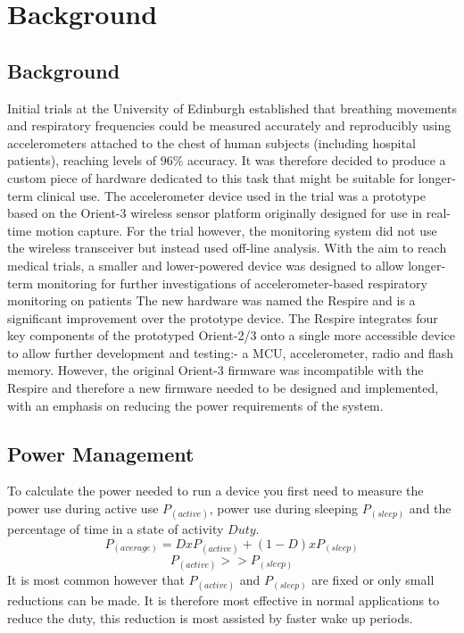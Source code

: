 \chapter{Background}

\section{Background}
Initial trials at the University of Edinburgh established that breathing movements and respiratory
frequencies could be measured accurately and reproducibly using accelerometers attached to the
chest of human subjects (including hospital patients), reaching levels of 96\% accuracy\cite{BatesLingMannArvind2010}.
It was therefore decided to produce a custom piece of hardware dedicated
to this task that might be suitable for longer-term clinical use. The accelerometer device used in the
trial was a prototype based on the Orient-3 wireless sensor platform originally designed for use in
real-time motion capture. For the trial however, the monitoring system did not use the wireless
transceiver but instead used off-line analysis.
With the aim to reach medical trials, a smaller and lower-powered device was designed to allow
longer-term monitoring for further investigations of accelerometer-based respiratory monitoring on
patients The new hardware was named the Respire and is a significant improvement over the
prototype device. The Respire integrates four key components of the prototyped Orient-2/3 onto a
single more accessible device to allow further development and testing:- a \ac{MCU},
accelerometer, radio and flash memory. However, the original Orient-3 firmware was incompatible
with the Respire and therefore a new firmware needed to be designed and implemented, with an
emphasis on reducing the power requirements of the system.

\section{Power Management}
To calculate the power needed to run a device you first need to measure the power use during
active use \(P_(active)\), power use during sleeping \(P_(sleep)\) and the percentage of time in a state of
activity \(Duty\).
\[
  P_(average) = D x P_(active) + (1-D) x P_(sleep)
\]
\[
  P_(active) >> P_(sleep)
\]
It is most common however that \(P_(active)\) and \(P_(sleep)\) are fixed or only small reductions can be
made. It is therefore most effective in normal applications to reduce the duty, this reduction is most
assisted by faster wake up periods.



